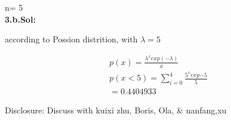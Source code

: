 \documentclass[a4paper,11pt]{article}\usepackage{graphicx, color}
\begin{document}
n= 5 \\
\textbf{3.b.Sol:} 

according to Possion distrition, with $\lambda=5$ 

\begin{align}
& p(x) = \frac{\lambda^{x}exp{(-\lambda)}}{x\!} \\
& p(x < 5) = \sum_{i=0}^{4}\frac{5^{x}exp{-5}}{5\!} \\
& = 0.4404933
\end{align}

Disclosure: Discuss with kuixi zhu, Boris, Ola, & nanfang,xu
\end{document}
